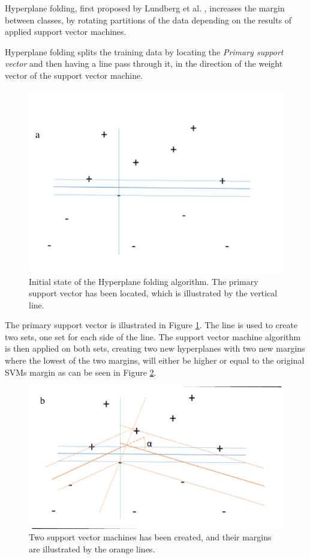 \documentclass[a4paper,twoside]{bth}
\begin{document}
\par Hyperplane folding, first proposed by Lundberg et al. \cite{unpublished}, increases the margin between classes, by rotating partitions of the data depending on the results of applied support vector machines. 
\par Hyperplane folding splits the training data by locating the \textit{Primary support vector} \cite{unpublished} and then having a line pass through it, in the direction of the weight vector of the support vector machine.
\begin{figure}
\centering
\includegraphics[scale=0.7]{images/intro-images/hpf_1.png}
   \caption{Initial state of the Hyperplane folding algorithm. The primary support vector has been located, which is illustrated by the vertical line.}
   \label{hpf_1}
\end{figure} 
The primary support vector is illustrated in Figure \ref{hpf_1}. The line is used to create two sets, one set for each side of the line. The support vector machine algorithm is then applied on both sets, creating two new hyperplanes with two new margins where the lowest of the two margins, will either be higher or equal to the original SVMs margin \cite{unpublished} as can be seen in Figure \ref{hpf_2}.
\begin{figure}
\centering
\includegraphics[scale=0.7]{images/intro-images/hpf_2.png}
   \caption{Two support vector machines has been created, and their margins are illustrated by the orange lines. }
   \label{hpf_2}
\end{figure} 
\end{document}
